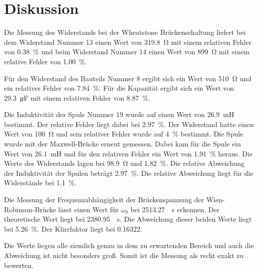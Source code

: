 \section{Diskussion}
\label{sec:Diskussion}

Die Messung des Widerstands bei der Wheatstone Brückenschaltung liefert bei dem Widerstand Nummer \num{13} 
einen Wert von \SI{319.8}{\ohm} mit einem relativen Fehler von \SI{0.38}{\percent} und beim Widerstand Nummer 
\num{14} einen Wert von \SI{899}{\ohm} mit einem relative Fehler von \SI{1.00}{\percent}. 

\noindent Für den Widerstand des Bauteils Nummer \num{8} ergibt sich ein Wert von 
\SI{510}{\ohm} und ein relativer Fehler von \SI{7.84}{\percent}. Für die Kapazität ergibt sich ein Wert von \SI{29.3}{\micro\farad} mit einem relativen Fehler von \SI{8.87}{\percent}.

\noindent Die Induktivität der Spule Nummer \num{19} wurde auf einen Wert von \SI{26.9}{\milli\henry} bestimmt. 
Der relative Fehler liegt dabei bei \SI{2.97}{\percent}. Der Widerstand hatte einen Wert von \SI{100}{\ohm} 
und sein relativer Fehler wurde auf \SI{4}{\percent} bestimmt. 
Die Spule wurde mit der Maxwell-Brücke erneut gemessen. Dabei kam für die Spule ein Wert von \SI{26.1}{\milli\henry} 
und für den relativen Fehler ein Wert von \SI{1.91}{\percent} heraus. Die Werte des Widerstands lagen bei 
\SI{98.9}{\ohm} und \SI{1.82}{\percent}.  Die relative Abweichung der Induktivität der Spulen beträgt \SI{2.97}{\percent}. Die relative Abweichung liegt für die Widerstände bei \SI{1.1}{\percent}.

\noindent Die Messung der Frequenzabhängigkeit der Brückenspannung der Wien-Robinson-Brücke lässt einen Wert für 
$\omega_0$ bei \SI[per-mode=fraction]{2513.27}{\per\second} erkennen. Der theoretische Wert liegt bei \SI[per-mode=fraction]{2380.95}{\per\second}. Die Abweichung dieser 
beiden Werte liegt bei \SI{5.26}{\percent}. Der Klirrfaktor liegt bei \num{0.16322}. 

\noindent Die Werte liegen alle ziemlich genau in dem zu erwartenden Bereich und auch die Abweichung ist nicht besonders groß. Somit ist die Messung als recht exakt zu bewerten. 
